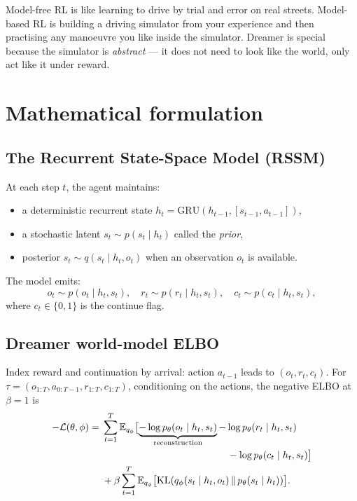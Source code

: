 \documentclass[11pt,oneside]{scrbook}
\begin{document}
\begin{intuition}
Model-free RL is like learning to drive by trial and error on real streets. Model-based RL is building a driving simulator from your experience and then practising any manoeuvre you like inside the simulator. Dreamer is special because the simulator is \emph{abstract} --- it does not need to look like the world, only act like it under reward.
\end{intuition}

\chapter{Mathematical formulation}

\section{The Recurrent State-Space Model (RSSM)}

\begin{definition}[RSSM]
At each step $t$, the agent maintains:
\begin{itemize}
  \item a deterministic recurrent state $h_t = \mathrm{GRU}(h_{t-1}, [s_{t-1}, a_{t-1}])$,
  \item a stochastic latent $s_t \sim p(s_t \mid h_t)$ called the \emph{prior},
  \item posterior $s_t \sim q(s_t \mid h_t, o_t)$ when an observation $o_t$ is available.
\end{itemize}
\end{definition}

The model emits:
\[
  o_t \sim p(o_t \mid h_t, s_t), \quad r_t \sim p(r_t \mid h_t, s_t),\quad c_t \sim p(c_t \mid h_t, s_t),
\]
where $c_t \in \{0, 1\}$ is the continue flag.

\section{Dreamer world-model ELBO}

\begin{theorem}
Index reward and continuation by arrival: action $a_{t-1}$ leads to $(o_t,r_t,c_t)$. For $\tau=(o_{1:T},a_{0:T-1},r_{1:T},c_{1:T})$, conditioning on the actions, the negative ELBO at $\beta=1$ is
\[
\begin{aligned}
  -\mathcal{L}(\theta, \phi)
  ={}& \sum_{t=1}^{T} \E_{q_\phi}\bigl[
    \underbrace{-\log p_\theta(o_t \mid h_t, s_t)}_{\text{reconstruction}}
    -\log p_\theta(r_t\mid h_t,s_t)\\
    &\hspace{4.5cm} -\log p_\theta(c_t\mid h_t,s_t)\bigr]\\
  &+ \beta \sum_{t=1}^{T} \E_{q_\phi}\bigl[
    \KL(q_\phi(s_t \mid h_t, o_t) \,\|\, p_\theta(s_t \mid h_t))\bigr].
\end{aligned}
\]
\end{theorem}
\end{document}
